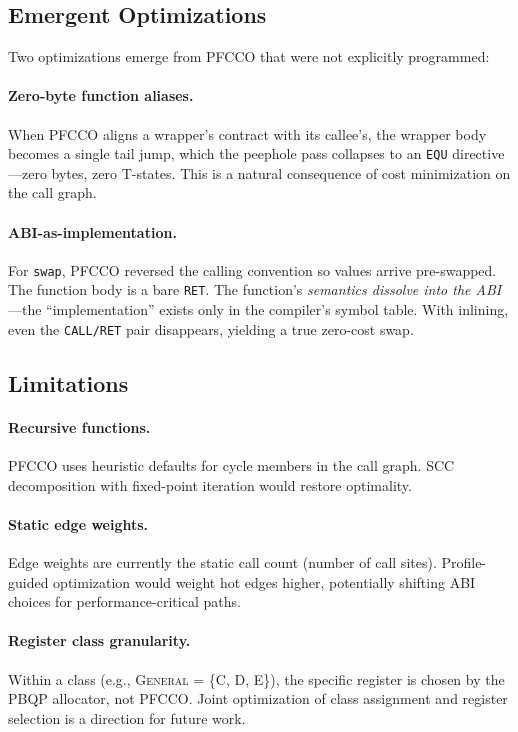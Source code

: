 \documentclass[sigplan,screen,nonacm]{acmart}
\begin{document}
\subsection{Emergent Optimizations}

Two optimizations emerge from PFCCO that were not explicitly programmed:

\paragraph{Zero-byte function aliases.}
When PFCCO aligns a wrapper's contract with its callee's, the wrapper body
becomes a single tail jump, which the peephole pass collapses to an
\texttt{EQU} directive---zero bytes, zero T-states.  This is a natural
consequence of cost minimization on the call graph.

\paragraph{ABI-as-implementation.}
For \texttt{swap}, PFCCO reversed the calling convention so values arrive
pre-swapped.  The function body is a bare \texttt{RET}.  The function's
\emph{semantics dissolve into the ABI}---the ``implementation'' exists
only in the compiler's symbol table.  With inlining, even the
\texttt{CALL/RET} pair disappears, yielding a true zero-cost swap.

\subsection{Limitations}

\paragraph{Recursive functions.}
PFCCO uses heuristic defaults for cycle members in the call graph.
SCC decomposition with fixed-point iteration would restore optimality.

\paragraph{Static edge weights.}
Edge weights are currently the static call count (number of call sites).
Profile-guided optimization would weight hot edges higher, potentially
shifting ABI choices for performance-critical paths.

\paragraph{Register class granularity.}
Within a class (e.g., \textsc{General} = \{C, D, E\}), the specific
register is chosen by the PBQP allocator, not PFCCO.  Joint optimization
of class assignment and register selection is a direction for future work.
\end{document}
